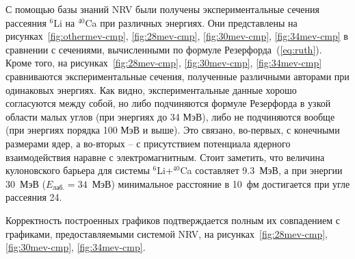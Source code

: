 \documentclass[a4paper, 12pt]{article}
\def\Li{$^6$}
\def\Ca{$^{40}$}
\begin{document}
С помощью базы знаний NRV были получены экспериментальные сечения 
рассеяния \Li Li на \Ca Ca при различных энергиях. Они представлены на 
рисунках~\ref{fig:othermev-cmp}, \ref{fig:28mev-cmp}, 
\ref{fig:30mev-cmp}, \ref{fig:34mev-cmp} в сравнении с сечениями, 
вычисленными по формуле Резерфорда~(\ref{eq:ruth}). Кроме того, на 
рисунках~\ref{fig:28mev-cmp}, \ref{fig:30mev-cmp}, \ref{fig:34mev-cmp} 
сравниваются экспериментальные сечения, полученные различными авторами 
при одинаковых энергиях. Как видно, экспериментальные данные хорошо 
согласуются между собой, но либо подчиняются формуле Резерфорда в узкой 
области малых углов (при энергиях до 34 МэВ), либо не подчиняются вообще 
(при энергиях порядка 100 МэВ и выше). Это связано, во-первых, 
с конечными размерами ядер, а во-вторых -- с присутствием потенциала 
ядерного взаимодействия наравне с электромагнитным. Стоит заметить, что 
величина кулоновского барьера для системы \Li Li+\Ca Ca составляет 
9.3~МэВ, а при энергии 30~МэВ ($E_\text{лаб.}=34$~МэВ) минимальное 
расстояние в 10~фм достигается при угле рассеяния 24\textdegree.

Корректность построенных графиков подтверждается полным их совпадением 
с графиками, предоставляемыми системой NRV, на 
рисунках~\ref{fig:28mev-cmp}, \ref{fig:30mev-cmp}, \ref{fig:34mev-cmp}.
\end{document}
